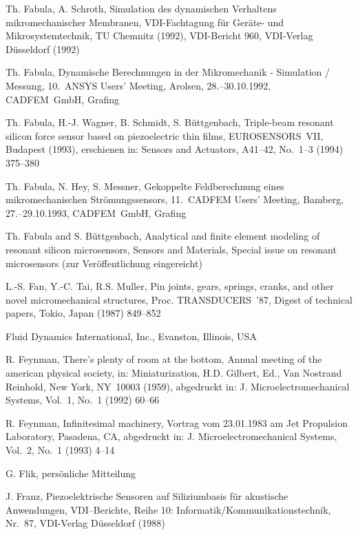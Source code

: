 \begin{thebibliography}{xxx}
 Th. Fabula, A. Schroth, Simulation des dynamischen Verhaltens
 mikromechanischer Membranen, VDI-Fachtagung für Geräte- und
 Mikrosystemtechnik, TU Chemnitz (1992), VDI-Bericht 960, VDI-Verlag
 Düsseldorf (1992)

 Th. Fabula, Dynamische Berechnungen in der Mikromechanik - Simulation /
 Messung, 10.~{\sf ANSYS} Users' Meeting, Arolsen, 28.--30.10.1992,
 CADFEM~GmbH, Grafing

 Th. Fabula, H.-J. Wagner, B. Schmidt, S. Büttgenbach, Triple-beam resonant
 silicon force sensor based on piezoelectric thin films, EUROSENSORS~VII,
 Budapest (1993), erschienen in: Sensors and Actuators, A41--42,
 No.~1--3 (1994) 375--380

 Th. Fabula, N. Hey, S. Messner, Gekoppelte Feldberechnung eines
 mikromechanischen Strömungssensors, 11.~CADFEM Users' Meeting, Bamberg,
 27.--29.10.1993, CADFEM~GmbH, Grafing

 Th. Fabula and S. Büttgenbach, Analytical and finite element modeling of
 resonant silicon microsensors, Sensors and Materials, Special issue on
 resonant microsensors (zur Veröffentlichung eingereicht)

 L.-S. Fan, Y.-C. Tai, R.S. Muller, Pin joints, gears, springs, cranks, and
 other novel micromechanical structures, Proc. TRANSDUCERS~'87, Digest of
 technical papers, Tokio, Japan (1987) 849--852

 Fluid Dynamics International, Inc., Evanston, Illinois, USA

 R. Feynman, There's plenty of room at the bottom, Annual meeting of the
 american physical society, in: Miniaturization, H.D. Gilbert, Ed.,
 Van Nostrand Reinhold, New York, NY~10003 (1959), abgedruckt in:
 J. Microelectromechanical Systems, Vol.~1, No.~1 (1992) 60--66

 R. Feynman, Infinitesimal machinery, Vortrag vom 23.01.1983 am
 Jet Propulsion Laboratory, Pasadena, CA, abgedruckt in:
 J. Microelectromechanical Systems, Vol.~2, No.~1 (1993) 4--14

 G. Flik, persönliche Mitteilung

 J. Franz, Piezoelektrische Sensoren auf Siliziumbasis für akustische
 Anwendungen, VDI--Berichte, Reihe 10: Informatik/Kommunikationstechnik,
 Nr.~87, VDI-Verlag Düsseldorf (1988)


\end{thebibliography}
